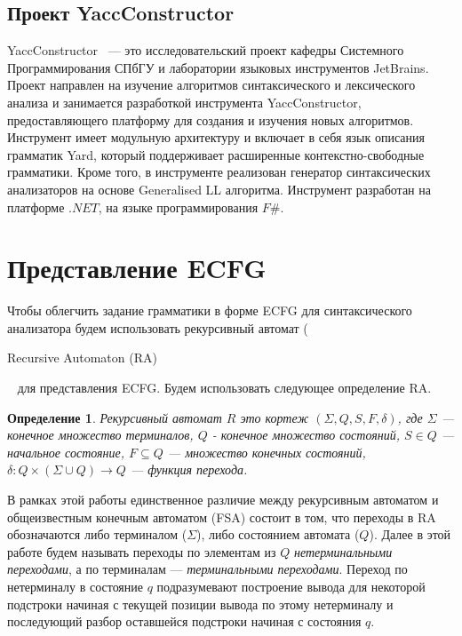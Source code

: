 \documentclass[14pt]{matmex-diploma-custom}
\newtheorem{mydef}{Определение}
\begin{document}
    \subsection{Проект YaccConstructor}
    YaccConstructor~\cite{YaccConstructor} --- это исследовательский проект кафедры Системного Программирования СПбГУ и лаборатории
    языковых инструментов JetBrains. Проект направлен на изучение алгоритмов синтаксического и 
    лексического анализа и занимается разработкой инструмента YaccConstructor, предоставляющего платформу для
    создания и изучения новых алгоритмов. Инструмент имеет модульную архитектуру и включает в себя язык описания 
    грамматик Yard, который поддерживает расширенные контекстно-свободные грамматики. Кроме того, в инструменте 
    реализован генератор синтаксических анализаторов на основе Generalised LL алгоритма.
    Инструмент разработан на платформе $.NET$, на языке программирования $F\#$.
    
	\section{Представление ECFG}
	
	Чтобы облегчить задание грамматики в форме ECFG для синтаксического анализатора
	будем использовать рекурсивный автомат (\begin{english} Recursive Automaton (RA)\end{english}~\cite{tellier2006learning}
	для представления ECFG. Будем использовать следующее определение RA.
	\begin{mydef}
		Рекурсивный автомат $R$ это кортеж $(\Sigma, Q, S, F, \delta)$, где $\Sigma$
		--- конечное множество терминалов, $Q$ - конечное множество состояний, $S \in Q$ 
		--- начальное состояние, $F \subseteq Q$ --- множество конечных состояний,
		$\delta : Q \times (\Sigma \cup Q) \to Q$ --- функция перехода.
	\end{mydef}
	В рамках этой работы единственное различие между рекурсивным автоматом и общеизвестным
	конечным автоматом (FSA) состоит в том, что переходы в RA обозначаются либо терминалом ($\Sigma$),
	либо состоянием автомата ($Q$). Далее в этой работе будем называть переходы по элементам из
	$Q$ \textit{нетерминальными переходами}, а по терминалам --- \textit{терминальными переходами}.
    Переход по нетерминалу в состояние $q$ подразумевают построение вывода для некоторой подстроки начиная с текущей позиции
    вывода по этому нетерминалу и последующий разбор оставшейся подстроки начиная с состояния $q$.
     
\end{document}
